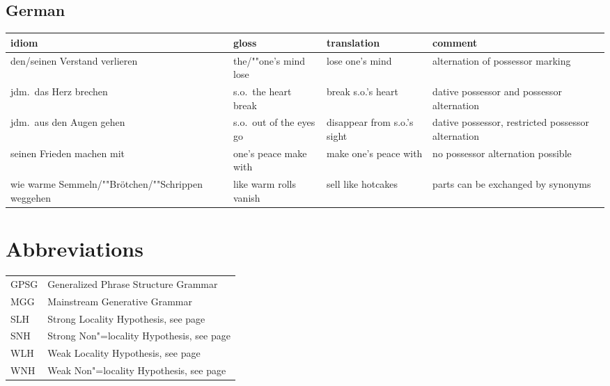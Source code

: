 \documentclass[output=paper
	        ,collection
	        ,collectionchapter
 	        ,biblatex
                ,babelshorthands
                ,newtxmath
                ,draftmode
                ,colorlinks, citecolor=brown
]{langscibook}
\begin{document}
\subsection*{German}

\begin{sideways}
\begin{tabular}{@{}L{4cm}lL{4.0cm}L{4.0cm}}
idiom & gloss & translation & comment\\\hline
%
 {den/seinen Verstand verlieren}
 & {the/""one's mind lose}
 & {lose one's mind}
 & {alternation of possessor marking}
 \\
 {jdm.\ das Herz brechen} & s.o.\ the heart break & break s.o.'s heart
 & {dative possessor and possessor alternation}\\
 {jdm.\ aus den Augen gehen} & s.o.\ out of the eyes go
 & {disappear from s.o.'s sight} &
 {dative possessor, restricted possessor alternation}\\
 {seinen Frieden machen mit}
 & {one's peace make with}
 & {make one's peace with}
 & {no possessor alternation possible}\\
 {wie warme Semmeln/""Brötchen/""Schrippen weggehen}
 & {like warm rolls vanish} & sell like hotcakes & 
 {parts can be exchanged by synonyms}\\
\end{tabular}
\end{sideways}

\section*{Abbreviations}

\begin{tabular}{@{}ll}
GPSG & Generalized Phrase Structure Grammar \citep{GKPS85a}\\
MGG & Mainstream Generative Grammar\\
SLH & Strong Locality Hypothesis, see page \pageref{slh}\\
SNH & Strong Non"=locality Hypothesis, see page \pageref{snh}\\
WLH & Weak Locality Hypothesis, see page \pageref{wlh}\\
WNH & Weak Non"=locality Hypothesis, see page \pageref{wnh}\\
\end{tabular}
\end{document}
